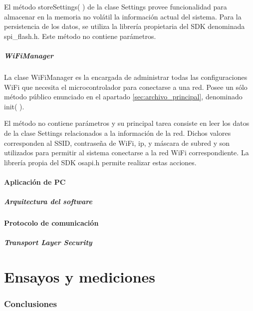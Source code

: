 
El método storeSettings( ) de la clase Settings provee funcionalidad para almacenar en la memoria no volátil la información actual del sistema.
Para la persistencia de los datos, se utiliza la librería propietaria del SDK denominada spi\_flash.h.
Este método no contiene parámetros.



\subsubsection{WiFiManager}

La clase WiFiManager es la encargada de administrar todas las configuraciones WiFi que necesita el microcontrolador para conectarse a una red.
Posee un sólo método público enunciado en el apartado \ref{sec:archivo_principal}, denominado init( ).


El método no contiene parámetros y su principal tarea consiste en leer los datos de la clase Settings relacionados a la información de la red.
Dichos valores corresponden al SSID, contraseña de WiFi, ip, y máscara de subred y son utilizados para permitir al sistema conectarse a la red WiFi correspondiente.
La librería propia del SDK osapi.h permite realizar estas acciones.

\subsection{Aplicación de PC}
\subsubsection{Arquitectura del software}
\subsection{Protocolo de comunicación}\label{sec:protocolo}
\subsubsection{Transport Layer Security}


\clearpage
\part{Ensayos y mediciones}\label{part:ensayos}
\section{Conclusiones}
